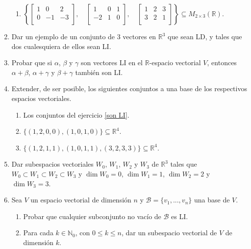 \begin{enumerate}[resume, topsep=6pt, itemsep=.4cm]
\begin{enumerate}
    \item $\left\{  \begin{bmatrix} 1 & 0 & 2 \\ 0 & -1 & -3 \\ \end{bmatrix}, \quad
    \begin{bmatrix} 1 & 0 & 1 \\ -2 & 1 & 0 \\ \end{bmatrix}, \quad
    \begin{bmatrix} 1 & 2 & 3 \\ 3 & 2 & 1 \\ \end{bmatrix} \right\}\subseteq M_{2\times 3}(\mathbb{R})$.
\end{enumerate}


\item Dar un ejemplo de un conjunto de 3 vectores en $\mathbb{R}^3$ que sean LD, y tales que dos cualesquiera de ellos sean LI.


\item  Probar que si $\alpha$, $\beta$ y $\gamma$ son vectores LI en el $\mathbb{R}$-espacio vectorial $V$, entonces $\alpha +\beta$, $\alpha +\gamma$ y $\beta +\gamma $ también son LI.


\item Extender, de ser posible, los siguientes conjuntos a una base de los respectivos espacios vectoriales.

\begin{enumerate}
    \item Los conjuntos del ejercicio \ref{son LI}.
    \item\label{10b} $\{ (1,2,0,0),(1,0,1,0) \}\subseteq\mathbb{R}^4$.
    \item\label{10c} $\{ (1,2,1,1),(1,0,1,1),(3,2,3,3)\}\subseteq\mathbb{R}^4$.
\end{enumerate}


\item Dar subespacios vectoriales $W_0$, $W_1$, $W_2$ y $W_3$ de $\mathbb{R}^3$ tales que $W_0\subset W_1\subset W_2\subset W_3$ y $\dim W_0=0$, $\dim W_1=1$, $\dim W_2=2$ y $\dim W_3=3$.


\item Sea $V$ un espacio vectorial de dimensión $n$ y $\mathcal{B}=\{v_1, ..., v_n\}$ una base de $V$.
\begin{enumerate}
 \item Probar que cualquier subconjunto no vacío de $\mathcal{B}$ es LI.
 \item Para cada $k\in\mathbb{N}_0$,  con $0\leq k\leq n$, dar un subespacio vectorial de $V$ de dimensión $k$.
\end{enumerate}



\end{enumerate}

